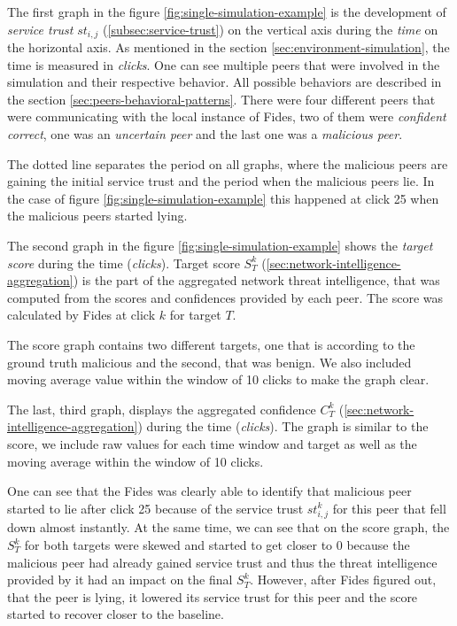 The first graph in the figure \ref{fig:single-simulation-example} is the development of \textit{service trust} $st_{i, j}$ (\ref{subsec:service-trust}) on the vertical axis during the \textit{time} on the horizontal axis. As mentioned in the section \ref{sec:environment-simulation}, the time is measured in \textit{clicks}.
One can see multiple peers that were involved in the simulation and their respective behavior. All possible behaviors are described in the section \ref{sec:peers-behavioral-patterns}.
There were four different peers that were communicating with the local instance of Fides, two of them were \textit{confident correct}, one was an \textit{uncertain peer} and the last one was a \textit{malicious peer}.

The dotted line separates the period on all graphs, where the malicious peers are gaining the initial service trust and the period when the malicious peers lie.
In the case of figure \ref{fig:single-simulation-example} this happened at click 25 when the malicious peers started lying.

The second graph in the figure \ref{fig:single-simulation-example} shows the \textit{target score} during the time (\textit{clicks}).
Target score $S^{k}_{T}$ (\ref{sec:network-intelligence-aggregation}) is the part of the aggregated network threat intelligence, that was computed from the scores and confidences provided by each peer.
The score was calculated by Fides at click $k$ for target $T$.

The score graph contains two different targets, one that is according to the ground truth malicious and the second, that was benign.
We also included moving average value within the window of 10 clicks to make the graph clear.

The last, third graph, displays the aggregated confidence $C^{k}_{T}$ (\ref{sec:network-intelligence-aggregation}) during the time (\textit{clicks}).
The graph is similar to the score, we include raw values for each time window and target as well as the moving average within the window of 10 clicks.

One can see that the Fides was clearly able to identify that malicious peer started to lie after click 25 because of the service trust $st^{k}_{i,j}$ for this peer that fell down almost instantly.
At the same time, we can see that on the score graph, the $S^{k}_{T}$ for both targets were skewed and started to get closer to $0$ because the malicious peer had already gained service trust and thus the threat intelligence provided by it had an impact on the final $S^{k}_{T}$.
However, after Fides figured out, that the peer is lying, it lowered its service trust for this peer and the score started to recover closer to the baseline.